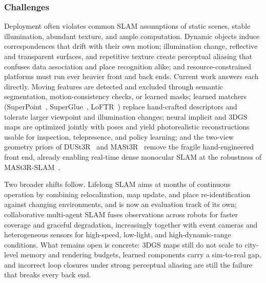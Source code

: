 \subsubsection{Challenges}
Deployment often violates common SLAM assumptions of static scenes, stable illumination, abundant texture, and ample computation. Dynamic objects induce correspondences that drift with their own motion; illumination change, reflective and transparent surfaces, and repetitive texture create perceptual aliasing that confuses data association and place recognition alike; and resource-constrained platforms must run ever heavier front and back ends. Current work answers each directly. Moving features are detected and excluded through semantic segmentation, motion-consistency checks, or learned masks; learned matchers (SuperPoint~\cite{detone2018superpoint}, SuperGlue~\cite{sarlin2020superglue}, LoFTR~\cite{Sun2021LoFTR}) replace hand-crafted descriptors and tolerate larger viewpoint and illumination changes; neural implicit and 3DGS maps are optimized jointly with poses and yield photorealistic reconstructions usable for inspection, telepresence, and policy learning; and the two-view geometry priors of DUSt3R~\cite{wang2024dust3r} and MASt3R~\cite{mast3r} remove the fragile hand-engineered front end, already enabling real-time dense monocular SLAM at the robustness of MASt3R-SLAM~\cite{Murai2025MASt3RSLAM}.

Two broader shifts follow. Lifelong SLAM aims at months of continuous operation by combining relocalization, map update, and place re-identification against changing environments, and is now an evaluation track of its own; collaborative multi-agent SLAM fuses observations across robots for faster coverage and graceful degradation, increasingly together with event cameras and heterogeneous sensors for high-speed, low-light, and high-dynamic-range conditions. What remains open is concrete: 3DGS maps still do not scale to city-level memory and rendering budgets, learned components carry a sim-to-real gap, and incorrect loop closures under strong perceptual aliasing are still the failure that breaks every back end.


